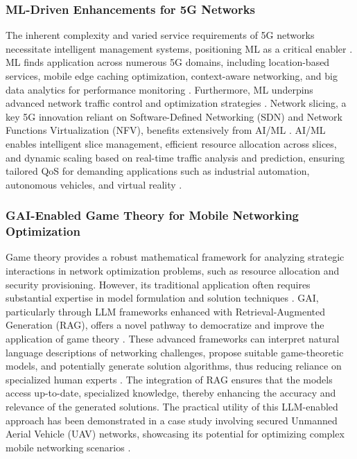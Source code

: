 \documentclass[sigconf]{acmart}
\begin{document}
\subsubsection{ML-Driven Enhancements for 5G Networks} \label{subsubsec:ml_5g}
The inherent complexity and varied service requirements of 5G networks necessitate intelligent management systems, positioning ML as a critical enabler \cite{ref1}. ML finds application across numerous 5G domains, including location-based services, mobile edge caching optimization, context-aware networking, and big data analytics for performance monitoring \cite{ref1}. Furthermore, ML underpins advanced network traffic control and optimization strategies \cite{ref1}. Network slicing, a key 5G innovation reliant on Software-Defined Networking (SDN) and Network Functions Virtualization (NFV), benefits extensively from AI/ML \cite{ref11}. AI/ML enables intelligent slice management, efficient resource allocation across slices, and dynamic scaling based on real-time traffic analysis and prediction, ensuring tailored QoS for demanding applications such as industrial automation, autonomous vehicles, and virtual reality \cite{ref11}.

\subsubsection{GAI-Enabled Game Theory for Mobile Networking Optimization} \label{subsubsec:gai_gametheory}
Game theory provides a robust mathematical framework for analyzing strategic interactions in network optimization problems, such as resource allocation and security provisioning. However, its traditional application often requires substantial expertise in model formulation and solution techniques \cite{ref21}. GAI, particularly through LLM frameworks enhanced with Retrieval-Augmented Generation (RAG), offers a novel pathway to democratize and improve the application of game theory \cite{ref21}. These advanced frameworks can interpret natural language descriptions of networking challenges, propose suitable game-theoretic models, and potentially generate solution algorithms, thus reducing reliance on specialized human experts \cite{ref21}. The integration of RAG ensures that the models access up-to-date, specialized knowledge, thereby enhancing the accuracy and relevance of the generated solutions. The practical utility of this LLM-enabled approach has been demonstrated in a case study involving secured Unmanned Aerial Vehicle (UAV) networks, showcasing its potential for optimizing complex mobile networking scenarios \cite{ref21}.
\end{document}
